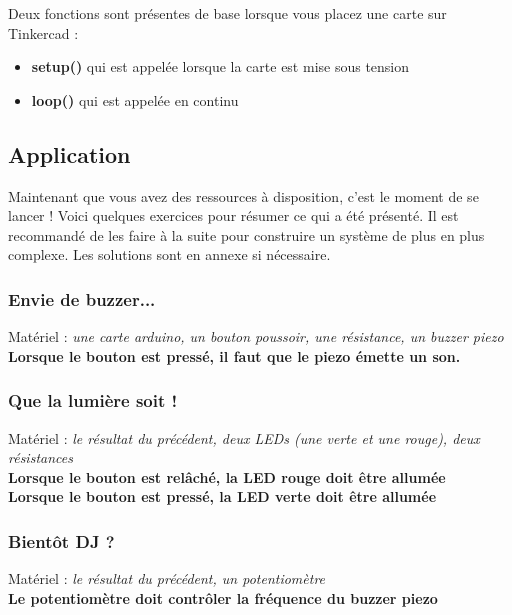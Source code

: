 \br
Deux fonctions sont présentes de base lorsque vous placez une carte sur Tinkercad :
\begin{itemize}
	\item \textbf{setup()} qui est appelée lorsque la carte est mise sous tension
	\item \textbf{loop()} qui est appelée en continu
\end{itemize}



\clearpage
\subsection{Application}
Maintenant que vous avez des ressources à disposition, c'est le moment de se lancer !
Voici quelques exercices pour résumer ce qui a été présenté.
Il est recommandé de les faire à la suite pour construire un système de plus en plus complexe.
Les solutions sont en annexe si nécessaire.

\subsubsection{Envie de buzzer...}
Matériel : \textit{une carte arduino, un bouton poussoir, une résistance, un buzzer piezo}
\\
\textbf{Lorsque le bouton est pressé, il faut que le piezo émette un son.}

\subsubsection{Que la lumière soit !}
Matériel : \textit{le résultat du précédent, deux LEDs (une verte et une rouge), deux résistances}
\\
\textbf{Lorsque le bouton est relâché, la LED rouge doit être allumée}
\\
\textbf{Lorsque le bouton est pressé, la LED verte doit être allumée}

\subsubsection{Bientôt DJ ?}
Matériel : \textit{le résultat du précédent, un potentiomètre}
\\
\textbf{Le potentiomètre doit contrôler la fréquence du buzzer piezo}